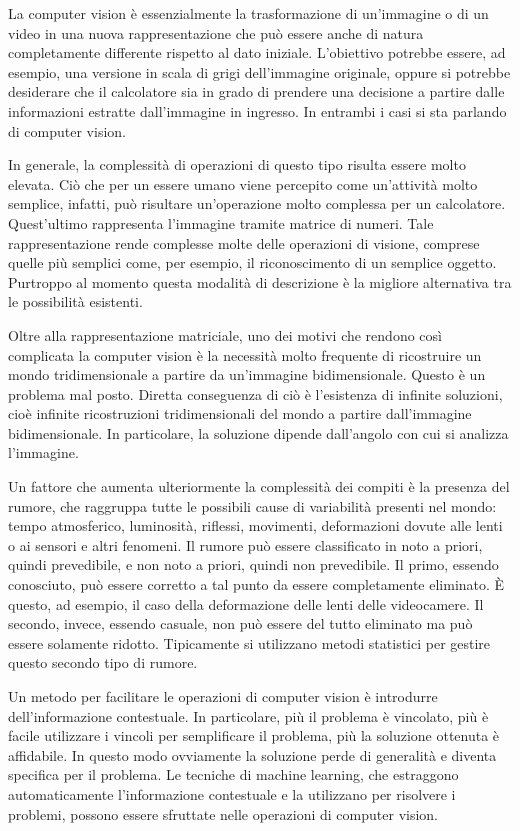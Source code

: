 				La computer vision è essenzialmente la trasformazione di un'immagine o di un video in una nuova rappresentazione che può essere anche di natura completamente differente rispetto al dato iniziale. 
				L'obiettivo potrebbe essere, ad esempio, una versione in scala di grigi dell'immagine originale, oppure si potrebbe desiderare che il calcolatore sia in grado di prendere una decisione a partire dalle informazioni estratte dall'immagine in ingresso.
				In entrambi i casi si sta parlando di computer vision.
		
				In generale, la complessità di operazioni di questo tipo risulta essere molto elevata. 
				Ciò che per un essere umano viene percepito come un'attività molto semplice, infatti, può risultare un'operazione molto complessa per un calcolatore.
				Quest'ultimo rappresenta l'immagine tramite matrice di numeri. 
				Tale rappresentazione rende complesse molte delle operazioni di visione, comprese quelle più semplici come, per esempio, il riconoscimento di un semplice oggetto.
				Purtroppo al momento questa modalità di descrizione è la migliore alternativa tra le possibilità esistenti.

				Oltre alla rappresentazione matriciale, uno dei motivi che rendono così complicata la computer vision è la necessità molto frequente di ricostruire un mondo tridimensionale a partire da un'immagine bidimensionale. 
				Questo è un problema mal posto. 
				Diretta conseguenza di ciò è l'esistenza di infinite soluzioni, cioè infinite ricostruzioni tridimensionali del mondo a partire dall'immagine bidimensionale.
				In particolare, la soluzione dipende dall'angolo con cui si analizza l'immagine.

				Un fattore che aumenta ulteriormente la complessità dei compiti è la presenza del rumore, che raggruppa tutte le possibili cause di variabilità presenti nel mondo: tempo atmosferico, luminosità, riflessi, movimenti, deformazioni dovute alle lenti o ai sensori e altri fenomeni.
				Il rumore può essere classificato in noto a priori, quindi prevedibile, e non noto a priori, quindi non prevedibile. 
				Il primo, essendo conosciuto, può essere corretto a tal punto da essere completamente eliminato.
				È questo, ad esempio, il caso della deformazione delle lenti delle videocamere.
				Il secondo, invece, essendo casuale, non può essere del tutto eliminato ma può essere solamente ridotto.
				Tipicamente si utilizzano metodi statistici per gestire questo secondo tipo di rumore. 
			 
				Un metodo per facilitare le operazioni di computer vision è introdurre dell'informazione contestuale. 
				In particolare, più il problema è vincolato, più è facile utilizzare i vincoli per semplificare il problema, più la soluzione ottenuta è affidabile.
				In questo modo ovviamente la soluzione perde di generalità e diventa specifica per il problema.
				Le tecniche di machine learning, che estraggono automaticamente l'informazione contestuale e la utilizzano per risolvere i problemi, possono essere sfruttate nelle operazioni di computer vision.
				
